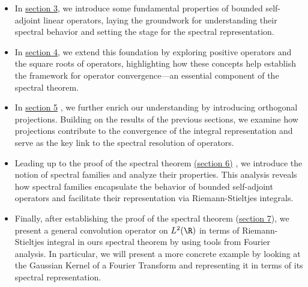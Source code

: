 \begin{itemize}
    \item In {\hyperref[section 3]{section 3}}, we introduce some fundamental properties of bounded self-adjoint linear operators, laying the groundwork for understanding their spectral behavior and setting the stage for the spectral representation.
    \item In {\hyperref[section 4]{section 4}}, we extend this foundation by exploring positive operators and the square roots of operators, highlighting how these concepts help establish the framework for operator convergence—an essential component of the spectral theorem.
    \item In {\hyperref[section 5]{section 5}} , we further enrich our understanding by introducing orthogonal projections. Building on the results of the previous sections, we examine how projections contribute to the convergence of the integral representation and serve as the key link to the spectral resolution of operators.
    \item Leading up to the proof of the spectral theorem {\hyperref[section 6]{(section 6)}} , we introduce the notion of spectral families and analyze their properties. This analysis reveals how spectral families encapsulate the behavior of bounded self-adjoint operators and facilitate their representation via Riemann-Stieltjes integrals.
    \item Finally, after establishing the proof of the spectral theorem ({\hyperref[section 7]{section 7}}), we present a general convolution operator on \( L^{2}(\R) \) in terms of Riemann-Stieltjes integral in ours spectral theorem by using tools from Fourier analysis. In particular, we will present a more concrete example by looking at the Gaussian Kernel of a Fourier Transform and representing it in terms of its spectral representation.
\end{itemize}






